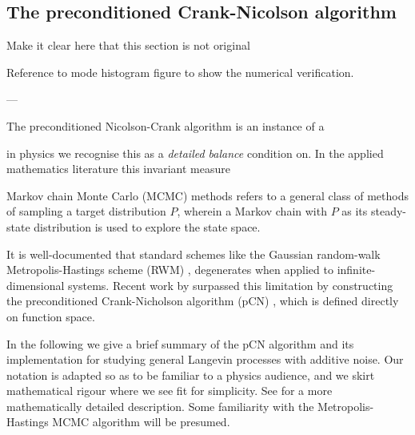 \subsection{The preconditioned Crank-Nicolson algorithm} \label{sec:The preconditioned Crank-Nicolson algorithm}

Make it clear here that this section is not original

Reference to mode histogram figure to show the numerical verification.


---

The preconditioned Nicolson-Crank algorithm is an instance of a 

in physics we recognise this as a \textit{detailed balance} condition on. In the applied mathematics literature this invariant measure

Markov chain Monte Carlo (MCMC) methods refers to a general class of methods of sampling a target distribution $P$, wherein a Markov chain with $P$ as its steady-state distribution is used to explore the state space.

It is well-documented that standard schemes like the Gaussian random-walk Metropolis-Hastings scheme (RWM) \citep{metropolisEquationStateCalculations1953, hastingsMonteCarloSampling1970}, degenerates when applied to infinite-dimensional systems. Recent work by \citep{stuartConditionalPathSampling2004a, AnalysisSPDEsArising, hairerAnalysisSPDEsArising2007, cotterMCMCMethodsFunctions2013} surpassed this limitation by constructing the preconditioned Crank-Nicholson algorithm (pCN) \citep{cotterMCMCMethodsFunctions2013}, which is defined directly on function space.

In the following we give a brief summary of the pCN algorithm and its implementation for studying general Langevin processes with additive noise. Our notation is adapted so as to be familiar to a physics audience, and we skirt mathematical rigour where we see fit for simplicity. See \citep{cotterMCMCMethodsFunctions2013} for a more mathematically detailed description. Some familiarity with the Metropolis-Hastings MCMC algorithm will be presumed.

